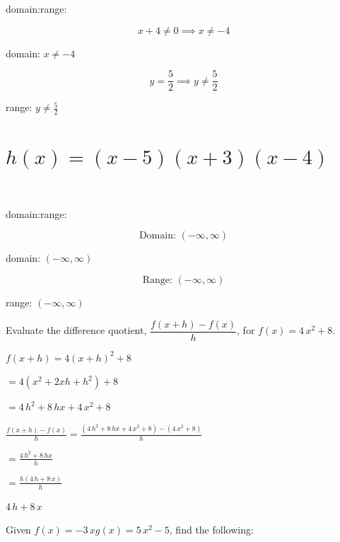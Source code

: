 \documentclass[addpoints]{exam}
\renewcommand*\half{.5}
\begin{document}
\begin{questions}
\begin{parts}
domain:range:
    \begin{solution}
    \[x + 4 \neq 0 \implies x \neq -4\]

domain: \(\boxed{ x \neq -4 }\)

\[y = \frac{5}{2} \implies y \neq \frac{5}{2}\]

range: \(\boxed{ y \neq \frac{5}{2} }\)
    \end{solution}

    \part[4\half]{\(\displaystyle{ h(x) = (x - 5)(x + 3)(x - 4) }\)}\\ 
    
domain:range:
    \begin{solution}
    \[\text{Domain: } (-\infty, \infty)\]

domain: \(\boxed{ (-\infty, \infty) }\)

\[\text{Range: } (-\infty, \infty)\]

range: \(\boxed{ (-\infty, \infty) }\)
    \end{solution}
\end{parts}
\newpage

\question[4]
Evaluate the difference quotient, \(\dfrac{f(x+h)-f(x)}{h}\), for \(\displaystyle{ f(x) = 4 \, x^{2} + 8 }\).\\
\begin{solution}
\(f(x+h) = 4(x+h)^2 + 8\) 

 \(= 4(x^2 + 2xh + h^2) + 8\) 

 \(= 4 \, h^{2} + 8 \, h x + 4 \, x^{2} + 8\) 

 \(\displaystyle{\frac{f(x+h)-f(x)}{h} = \frac{ (4 \, h^{2} + 8 \, h x + 4 \, x^{2} + 8) - (4 \, x^{2} + 8) }{h}}\) 

 \(=\displaystyle{ \frac{ 4 \, h^{2} + 8 \, h x }{h}}\) 

 \(= \displaystyle{ \frac{ h(4 \, h + 8 \, x) }{h}}\) 

 \(\boxed{ 4 \, h + 8 \, x }\)
\end{solution}
\answerline

\question
Given \(\displaystyle{ f(x) = -3 \, x }\)\(\displaystyle{ g(x) = 5 \, x^{2} - 5 }\), find the following:\\
    \begin{parts}

\end{parts}
\end{questions}
\end{document}
